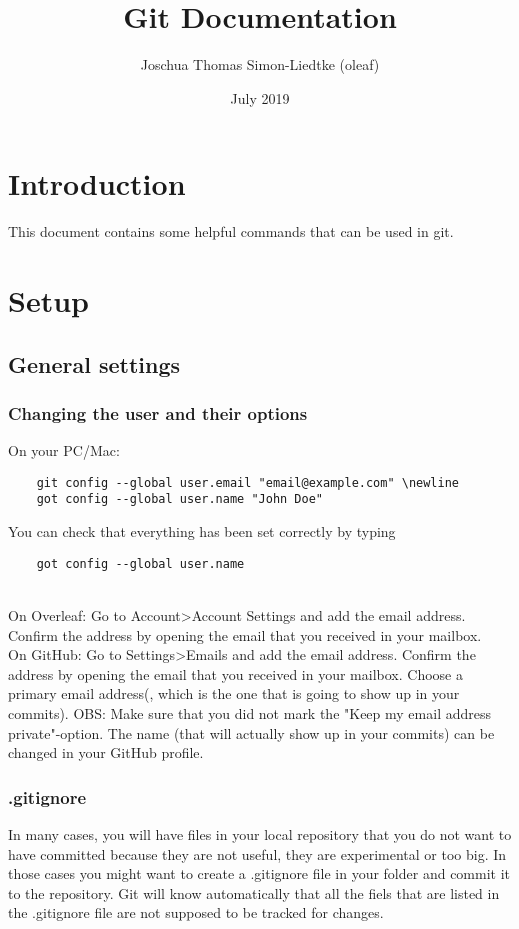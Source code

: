 \documentclass{article}
\title{Git Documentation}
\author{Joschua Thomas Simon-Liedtke (oleaf)}
\date{July 2019}
\begin{document}
\maketitle

\section{Introduction}
This document contains some helpful commands that can be used in git.

\section{Setup}

\subsection{General settings}

\subsubsection{Changing the user and their options}

On your PC/Mac:
\begin{verbatim}
	git config --global user.email "email@example.com" \newline
	got config --global user.name "John Doe"
\end{verbatim}
You can check that everything has been set correctly by typing
\begin{verbatim}
	got config --global user.name
\end{verbatim}
\\

On Overleaf:
Go to Account\textgreater  Account Settings and add the email address. Confirm the address by opening the email that you received in your mailbox.
\\

On GitHub:
Go to Settings\textgreater  Emails and add the email address. Confirm the address by opening the email that you received in your mailbox. Choose a primary email address(, which is the one that is going to show up in your commits). OBS: Make sure that you did not mark the "Keep my email address private"-option. The name (that will actually show up in your commits) can be changed in your GitHub profile.

\subsubsection{.gitignore}
In many cases, you will have files in your local repository that you do not want to have committed because they are not useful, they are experimental or too big. In those cases you might want to create a .gitignore file in your folder and commit it to the repository. Git will know automatically that all the fiels that are listed in the .gitignore file are not supposed to be tracked for changes.
\end{document}
